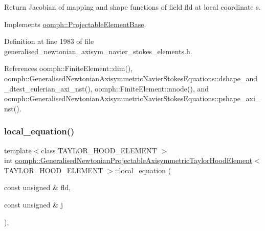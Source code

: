 Return Jacobian of mapping and shape functions of field fld at local coordinate s. 



Implements \hyperlink{classoomph_1_1ProjectableElementBase_ad45c21b58c0985d52f68ab2d79cbb488}{oomph\+::\+Projectable\+Element\+Base}.



Definition at line 1983 of file generalised\+\_\+newtonian\+\_\+axisym\+\_\+navier\+\_\+stokes\+\_\+elements.\+h.



References oomph\+::\+Finite\+Element\+::dim(), oomph\+::\+Generalised\+Newtonian\+Axisymmetric\+Navier\+Stokes\+Equations\+::dshape\+\_\+and\+\_\+dtest\+\_\+eulerian\+\_\+axi\+\_\+nst(), oomph\+::\+Finite\+Element\+::nnode(), and oomph\+::\+Generalised\+Newtonian\+Axisymmetric\+Navier\+Stokes\+Equations\+::pshape\+\_\+axi\+\_\+nst().

\mbox{\label{classoomph_1_1GeneralisedNewtonianProjectableAxisymmetricTaylorHoodElement_a0aae7918d2345fd33db3c7970a596736}} 
\subsubsection{\texorpdfstring{local\+\_\+equation()}{local\_equation()}}
{\footnotesize\ttfamily template$<$class T\+A\+Y\+L\+O\+R\+\_\+\+H\+O\+O\+D\+\_\+\+E\+L\+E\+M\+E\+NT $>$ \\
int \hyperlink{classoomph_1_1GeneralisedNewtonianProjectableAxisymmetricTaylorHoodElement}{oomph\+::\+Generalised\+Newtonian\+Projectable\+Axisymmetric\+Taylor\+Hood\+Element}$<$ T\+A\+Y\+L\+O\+R\+\_\+\+H\+O\+O\+D\+\_\+\+E\+L\+E\+M\+E\+NT $>$\+::local\+\_\+equation (\begin{DoxyParamCaption}\item[{const unsigned \&}]{fld,  }\item[{const unsigned \&}]{j }\end{DoxyParamCaption})\hspace{0.3cm}{\ttfamily [inline]}, {\ttfamily [virtual]}}



